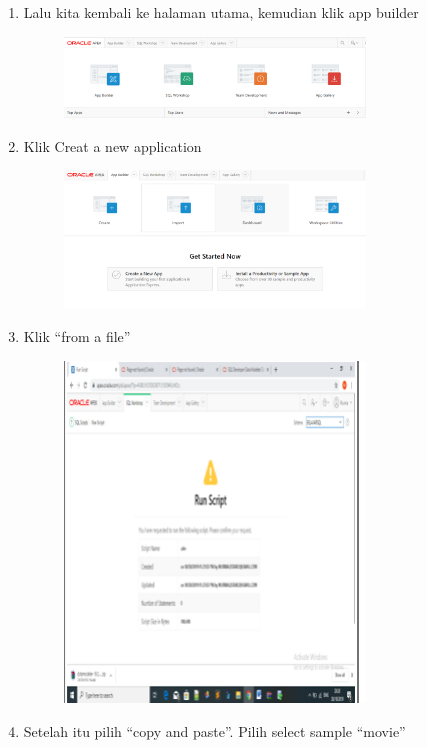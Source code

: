 \documentclass{article}
\begin{document}
\begin{enumerate}
\begin{figure}[h]
            \end{figure}
    \newpage \item Lalu kita kembali ke halaman utama, kemudian klik app builder
    \begin{figure}[h]
            \centerline{\includegraphics[width=8cm]{image/7,1.png}}
            \end{figure}
    \item Klik Creat a new application
           \begin{figure}[h]
            \centerline{\includegraphics[width=8cm]{image/7,2.png}}
            \end{figure}
    \item 	Klik “from a file”
    \begin{figure}[h]
            \centerline{\includegraphics[width=8cm]{image/8.png}}
            \end{figure}
    \item Setelah itu pilih “copy and paste”. Pilih select sample “movie”
    \begin{figure}[h]

\end{figure}
\end{enumerate}
\end{document}
